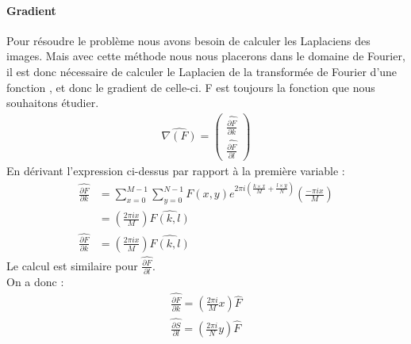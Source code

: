 \paragraph{Gradient}
Pour résoudre le problème nous avons besoin de calculer les Laplaciens des images. Mais avec cette méthode nous nous placerons dans le domaine de Fourier, il est donc nécessaire de calculer le Laplacien de la transformée de Fourier d'une fonction , et donc le gradient de celle-ci. 
F est toujours la fonction que nous souhaitons étudier. 
\begin{equation}
\begin{aligned}
\widehat{\nabla (F)}=
\begin{pmatrix}
\widehat{\frac{\partial F}{\partial k}}\\
\widehat{\frac{\partial F}{\partial l}}
\end{pmatrix}
\end{aligned}
\end{equation}
En dérivant l'expression ci-dessus par rapport à la première variable : 
\begin{equation}
\begin{aligned}
\widehat{\frac{\partial F}{\partial k}} &= \sum_{x = 0}^{M-1} \sum_{y = 0}^{N-1} F(x,y) e^{2\pi i\left(\frac{k\times x}{M}+\frac{l\times y}{N}\right)}\left(\frac{-\pi i x}{M}\right)\\
& = \left(\frac{2\pi i x}{M}\right)\widehat{F(k,l)}\\
\widehat{\frac{\partial F}{\partial k}} &= \left(\frac{2\pi i x}{M}\right)\widehat{F(k,l)}
\end{aligned}
\end{equation}
Le calcul est similaire pour $\widehat{\frac{\partial F}{\partial l}}$.\\
On a donc : 
\begin{equation}
\begin{aligned}
\widehat{\frac{\partial F}{\partial k}} = \left(\frac{2\pi i}{M}x\right) \widehat{F}\\
\widehat{\frac{\partial S}{\partial l}} = \left(\frac{2\pi i}{N}y\right) \widehat{F}\\
\end{aligned}
\end{equation}

